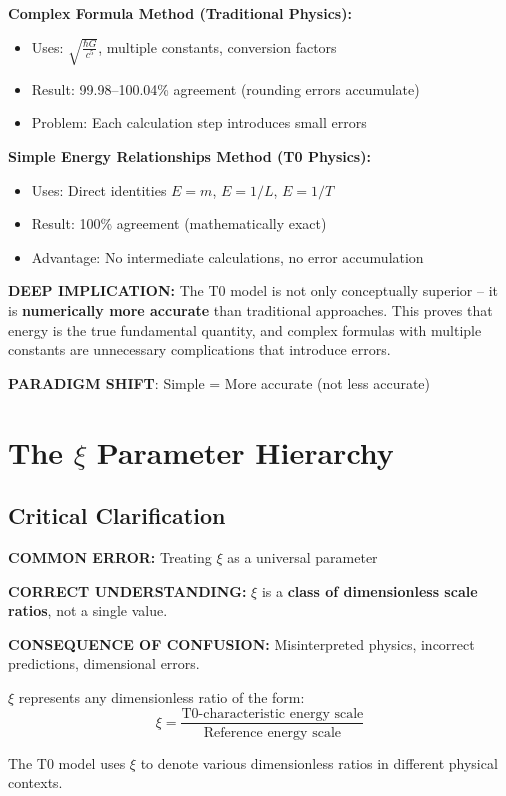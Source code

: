 	\begin{tcolorbox}[colback=blue!5!white,colframe=blue!75!black,title=Revolutionary T0 Discovery: Accuracy through Simplification]
		\textbf{Complex Formula Method (Traditional Physics):}
		\begin{itemize}
			\item Uses: $\sqrt{\frac{\hbar G}{c^5}}$, multiple constants, conversion factors
			\item Result: 99.98–100.04\% agreement (rounding errors accumulate)
			\item Problem: Each calculation step introduces small errors
		\end{itemize}
		
		\textbf{Simple Energy Relationships Method (T0 Physics):}
		\begin{itemize}
			\item Uses: Direct identities $E = m$, $E = 1/L$, $E = 1/T$
			\item Result: 100\% agreement (mathematically exact)
			\item Advantage: No intermediate calculations, no error accumulation
		\end{itemize}
		
		\textbf{DEEP IMPLICATION:}
		The T0 model is not only conceptually superior – it is \textbf{numerically more accurate} than traditional approaches. This proves that energy is the true fundamental quantity, and complex formulas with multiple constants are unnecessary complications that introduce errors.
		
		\textbf{PARADIGM SHIFT}: Simple = More accurate (not less accurate)
	\end{tcolorbox}
	
	\section{The $\xi$ Parameter Hierarchy}
	
	\subsection{Critical Clarification}
	
	\begin{tcolorbox}[colback=red!10!white,colframe=red!75!black,title=CRITICAL WARNING: $\xi$ Parameter Confusion]
		\textbf{COMMON ERROR:} Treating $\xi$ as a universal parameter
		
		\textbf{CORRECT UNDERSTANDING:} $\xi$ is a \textbf{class of dimensionless scale ratios}, not a single value.
		
		\textbf{CONSEQUENCE OF CONFUSION:} Misinterpreted physics, incorrect predictions, dimensional errors.
		
		$\xi$ represents any dimensionless ratio of the form:
		\begin{equation}
			\xi = \frac{\text{T0-characteristic energy scale}}{\text{Reference energy scale}}
		\end{equation}
		
		The T0 model uses $\xi$ to denote various dimensionless ratios in different physical contexts.
	\end{tcolorbox}
	

